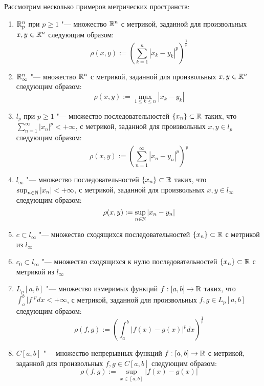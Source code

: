 \begin{example}
	Рассмотрим несколько примеров метрических пространств:
	\begin{enumerate}
		\item $\mathbb{R}^n_p$ при $p \ge 1$ "--- множество $\mathbb{R}^n$ с метрикой, заданной для произвольных $x, y \in \mathbb{R}^n$ сле\-дующим образом:
		\[\rho(x, y) := \left(\sum_{k = 1}^n|x_k - y_k|^p\right)^{\frac 1p}\]
  
		\item $\mathbb{R}^n_\infty$ "--- множество $\mathbb{R}^n$ с метрикой, заданной для произвольных $x, y \in \mathbb{R}^n$ следующим образом:
		\[\rho(x, y) := \max_{1 \le k \le n}|x_k - y_k|\]
  
		\item $l_p$ при $p \ge 1$ "--- множество последовательностей $\{x_n\} \subset \mathbb{R}$ таких, что $\sum_{n = 1}^\infty |x_n|^p < +\infty$, с метрикой, заданной для произвольных $x, y \in l_p$ следующим образом:
		\[\rho(x, y) := \left(\sum_{n = 1}^\infty|x_n - y_n|^p\right)^{\frac 1p}\]
  
		\item $l_\infty$ "--- множество последовательностей $\{x_n\} \subset \mathbb{R}$ таких, что $\sup_{n \in \mathbb{N}} |x_n| < +\infty$, с метрикой, заданной для произвольных $x, y \in l_\infty$ следующим образом:
		\[\rho(x, y) := \sup_{n \in \mathbb{N}}|x_n - y_n|\]

		\item $c \subset l_\infty$ "--- множество сходящихся последовательностей $\{x_n\} \subset \mathbb{R}$ с метрикой из $l_\infty$

		\item $c_0 \subset l_\infty$ "--- множество сходящихся к нулю последовательностей $\{x_n\} \subset \mathbb{R}$ с метрикой из $l_\infty$
  
		\item $L_p[a, b]$ "--- множество измеримых функций $f : [a, b] \to \mathbb{R}$ таких, что $\int_a^b |f|^pdx < + \infty$, с метрикой, заданной для произвольных $f, g \in L_p[a, b]$ следующим образом:
		\[\rho(f, g) := \left(\int_a^b |f(x) - g(x)|^pdx\right)^{\frac 1p}\]

		\item $C[a, b]$ "--- множество непрерывных функций $f : [a, b] \to \mathbb{R}$ с метрикой, заданной для произвольных $f, g \in C[a, b]$ следующим образом:
		\[\rho(f, g) := \sup_{x \in [a, b]}|f(x) - g(x)|\]
	\end{enumerate}
\end{example}

